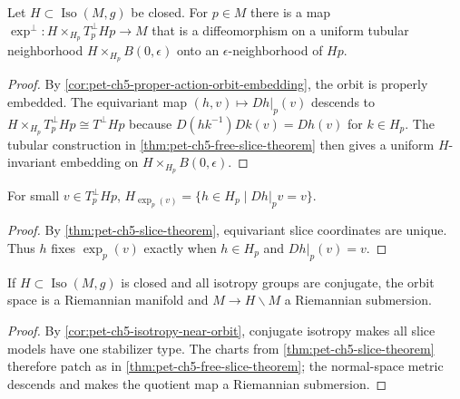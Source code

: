 \begin{theorem}
  \label{thm:pet-ch5-slice-theorem}
  Let $H\subset\operatorname{Iso}(M,g)$ be closed. For $p\in M$ there is a map
  $\exp^\perp:H\times_{H_p}T_p^\perp Hp\to M$ that is a diffeomorphism on a uniform
  tubular neighborhood $H\times_{H_p}B(0,\epsilon)$ onto an $\epsilon$-neighborhood
  of $Hp$.
\end{theorem}
\begin{proof}
  \sketch
  By \cref{cor:pet-ch5-proper-action-orbit-embedding}, the orbit is properly
  embedded. The equivariant map $(h,v)\mapsto Dh|_p(v)$ descends to
  $H\times_{H_p}T_p^\perp Hp\cong T^\perp Hp$ because
  $D(hk^{-1})Dk(v)=Dh(v)$ for $k\in H_p$. The tubular construction in
  \cref{thm:pet-ch5-free-slice-theorem} then gives a uniform $H$-invariant
  embedding on $H\times_{H_p}B(0,\epsilon)$.
\end{proof}

\begin{corollary}
  \label{cor:pet-ch5-isotropy-near-orbit}
  For small $v\in T_p^\perp Hp$, $H_{\exp_p(v)}=\{h\in H_p\mid Dh|_pv=v\}$.
\end{corollary}
\begin{proof}
  \sketch
  By \cref{thm:pet-ch5-slice-theorem}, equivariant slice coordinates are unique.
  Thus $h$ fixes $\exp_p(v)$ exactly when $h\in H_p$ and $Dh|_p(v)=v$.
\end{proof}

\begin{corollary}
  \label{cor:pet-ch5-conjugate-isotropy-manifold}
  If $H\subset\operatorname{Iso}(M,g)$ is closed and all isotropy groups are
  conjugate, the orbit space is a Riemannian manifold and $M\to H\backslash M$ a
  Riemannian submersion.
\end{corollary}
\begin{proof}
  \sketch
  By \cref{cor:pet-ch5-isotropy-near-orbit}, conjugate isotropy makes all slice
  models have one stabilizer type.  The charts from
  \cref{thm:pet-ch5-slice-theorem} therefore patch as in
  \cref{thm:pet-ch5-free-slice-theorem}; the normal-space metric descends and makes
  the quotient map a Riemannian submersion.
\end{proof}

